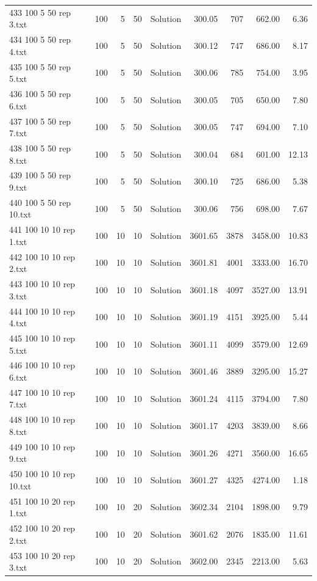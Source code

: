 \begin{longtable}{lrrllrrrr}
433 100 5 50 rep 3.txt & 100 & 5 & 50 & Solution & 300.05 & 707 & 662.00 &  6.36\\
434 100 5 50 rep 4.txt & 100 & 5 & 50 & Solution & 300.12 & 747 & 686.00 &  8.17\\
435 100 5 50 rep 5.txt & 100 & 5 & 50 & Solution & 300.06 & 785 & 754.00 &  3.95\\
436 100 5 50 rep 6.txt & 100 & 5 & 50 & Solution & 300.05 & 705 & 650.00 &  7.80\\
437 100 5 50 rep 7.txt & 100 & 5 & 50 & Solution & 300.05 & 747 & 694.00 &  7.10\\
438 100 5 50 rep 8.txt & 100 & 5 & 50 & Solution & 300.04 & 684 & 601.00 & 12.13\\
439 100 5 50 rep 9.txt & 100 & 5 & 50 & Solution & 300.10 & 725 & 686.00 &  5.38\\
440 100 5 50 rep 10.txt & 100 & 5 & 50 & Solution & 300.06 & 756 & 698.00 &  7.67\\
441 100 10 10 rep 1.txt & 100 & 10 & 10 & Solution & 3601.65 & 3878 & 3458.00 & 10.83\\
442 100 10 10 rep 2.txt & 100 & 10 & 10 & Solution & 3601.81 & 4001 & 3333.00 & 16.70\\
443 100 10 10 rep 3.txt & 100 & 10 & 10 & Solution & 3601.18 & 4097 & 3527.00 & 13.91\\
444 100 10 10 rep 4.txt & 100 & 10 & 10 & Solution & 3601.19 & 4151 & 3925.00 &  5.44\\
445 100 10 10 rep 5.txt & 100 & 10 & 10 & Solution & 3601.11 & 4099 & 3579.00 & 12.69\\
446 100 10 10 rep 6.txt & 100 & 10 & 10 & Solution & 3601.46 & 3889 & 3295.00 & 15.27\\
447 100 10 10 rep 7.txt & 100 & 10 & 10 & Solution & 3601.24 & 4115 & 3794.00 &  7.80\\
448 100 10 10 rep 8.txt & 100 & 10 & 10 & Solution & 3601.17 & 4203 & 3839.00 &  8.66\\
449 100 10 10 rep 9.txt & 100 & 10 & 10 & Solution & 3601.26 & 4271 & 3560.00 & 16.65\\
450 100 10 10 rep 10.txt & 100 & 10 & 10 & Solution & 3601.27 & 4325 & 4274.00 &  1.18\\
451 100 10 20 rep 1.txt & 100 & 10 & 20 & Solution & 3602.34 & 2104 & 1898.00 &  9.79\\
452 100 10 20 rep 2.txt & 100 & 10 & 20 & Solution & 3601.62 & 2076 & 1835.00 & 11.61\\
453 100 10 20 rep 3.txt & 100 & 10 & 20 & Solution & 3602.00 & 2345 & 2213.00 &  5.63\\

\end{longtable}

